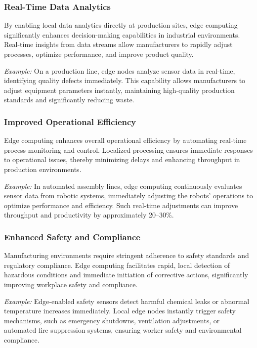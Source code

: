 \documentclass[runningheads]{llncs}
\begin{document}
\subsubsection{Real-Time Data Analytics}
By enabling local data analytics directly at production sites, edge computing significantly enhances decision-making capabilities in industrial environments. Real-time insights from data streams allow manufacturers to rapidly adjust processes, optimize performance, and improve product quality.

\textit{Example:} On a production line, edge nodes analyze sensor data in real-time, identifying quality defects immediately. This capability allows manufacturers to adjust equipment parameters instantly, maintaining high-quality production standards and significantly reducing waste.

\subsubsection{Improved Operational Efficiency}
Edge computing enhances overall operational efficiency by automating real-time process monitoring and control. Localized processing ensures immediate responses to operational issues, thereby minimizing delays and enhancing throughput in production environments.

\textit{Example:} In automated assembly lines, edge computing continuously evaluates sensor data from robotic systems, immediately adjusting the robots' operations to optimize performance and efficiency. Such real-time adjustments can improve throughput and productivity by approximately 20–30\%.

\subsubsection{Enhanced Safety and Compliance}
Manufacturing environments require stringent adherence to safety standards and regulatory compliance. Edge computing facilitates rapid, local detection of hazardous conditions and immediate initiation of corrective actions, significantly improving workplace safety and compliance.

\textit{Example:} Edge-enabled safety sensors detect harmful chemical leaks or abnormal temperature increases immediately. Local edge nodes instantly trigger safety mechanisms, such as emergency shutdowns, ventilation adjustments, or automated fire suppression systems, ensuring worker safety and environmental compliance.
\end{document}
